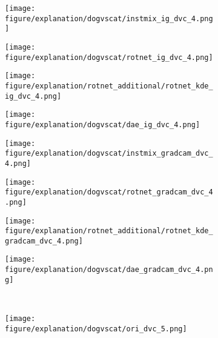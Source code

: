 \documentclass{article} \usepackage{iclr2021_conference,times}
\begin{document}
\begin{figure}[h!]
\hspace{-2mm}
\begin{subfigure}{.11\textwidth}
  \centering
  \texttt{[image: figure/explanation/dogvscat/instmix\_ig\_dvc\_4.png]}
\end{subfigure}
\hspace{-2mm}
\begin{subfigure}{.11\textwidth}
  \centering
  \texttt{[image: figure/explanation/dogvscat/rotnet\_ig\_dvc\_4.png]}
\end{subfigure}
\hspace{-2mm}
\begin{subfigure}{.11\textwidth}
  \centering
  \texttt{[image: figure/explanation/rotnet\_additional/rotnet\_kde\_ig\_dvc\_4.png]}
\end{subfigure}
\hspace{-2mm}
\begin{subfigure}{.11\textwidth}
  \centering
  \texttt{[image: figure/explanation/dogvscat/dae\_ig\_dvc\_4.png]}
\end{subfigure}
\hspace{-2mm}
\begin{subfigure}{.11\textwidth}
  \centering
  \texttt{[image: figure/explanation/dogvscat/instmix\_gradcam\_dvc\_4.png]}
\end{subfigure}
\hspace{-2mm}
\begin{subfigure}{.11\textwidth}
  \centering
  \texttt{[image: figure/explanation/dogvscat/rotnet\_gradcam\_dvc\_4.png]}
\end{subfigure}
\hspace{-2mm}
\begin{subfigure}{.11\textwidth}
  \centering
  \texttt{[image: figure/explanation/rotnet\_additional/rotnet\_kde\_gradcam\_dvc\_4.png]}
\end{subfigure}
\hspace{-2mm}
\begin{subfigure}{.11\textwidth}
  \centering
  \texttt{[image: figure/explanation/dogvscat/dae\_gradcam\_dvc\_4.png]}
\end{subfigure}\\
\begin{subfigure}{.11\textwidth}
  \centering
  \texttt{[image: figure/explanation/dogvscat/ori\_dvc\_5.png]}
\end{subfigure}
\hspace{-2mm}

\end{figure}
\end{document}
